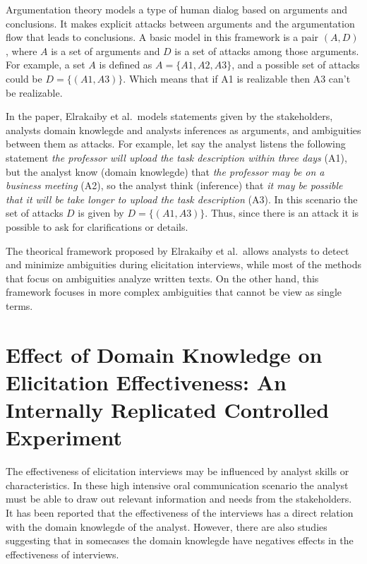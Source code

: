 \documentclass[]{llncs}
\begin{document}
Argumentation theory models a type of human dialog based on arguments
and conclusions. It makes explicit attacks between arguments and the
argumentation flow that leads to conclusions. A basic model in this
framework is a pair \((A,D)\), where \(A\) is a set of arguments and
\(D\) is a set of attacks among those arguments. For example, a set
\(A\) is defined as \(A = \{A1,A2,A3\}\), and a possible set of attacks
could be \(D = \{(A1,A3)\}\). Which means that if A1 is realizable then
A3 can't be realizable.

In the paper, Elrakaiby et al.~models statements given by the
stakeholders, analysts domain knowlegde and analysts inferences as
arguments, and ambiguities between them as attacks. For example, let say
the analyst listens the following statement \emph{the professor will
upload the task description within three days} (A1), but the analyst
know (domain knowlegde) that \emph{the professor may be on a business
meeting} (A2), so the analyst think (inference) that \emph{it may be
possible that it will be take longer to upload the task description}
(A3). In this scenario the set of attacks \(D\) is given by
\(D = \{(A1,A3)\}\). Thus, since there is an attack it is possible to
ask for clarifications or details.

The theorical framework proposed by Elrakaiby et al.~allows analysts to
detect and minimize ambiguities during elicitation interviews, while
most of the methods that focus on ambiguities analyze written texts. On
the other hand, this framework focuses in more complex ambiguities that
cannot be view as single terms.

\hypertarget{effect-of-domain-knowledge-on-elicitation-effectiveness-an-internally-replicated-controlled-experiment}{%
\section{Effect of Domain Knowledge on Elicitation Effectiveness: An
Internally Replicated Controlled
Experiment}\label{effect-of-domain-knowledge-on-elicitation-effectiveness-an-internally-replicated-controlled-experiment}}

The effectiveness of elicitation interviews may be influenced by analyst
skills or characteristics. In these high intensive oral communication
scenario the analyst must be able to draw out relevant information and
needs from the stakeholders. It has been reported that the effectiveness
of the interviews has a direct relation with the domain knowlegde of the
analyst. However, there are also studies suggesting that in somecases
the domain knowlegde have negatives effects in the effectiveness of
interviews.
\end{document}
